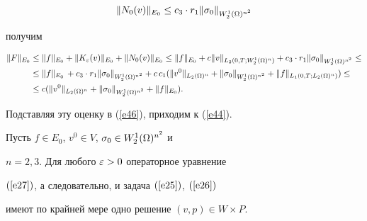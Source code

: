 \begin{pf}
\begin{equation}\label{e47}


\|N_0(v)\|_{E_0} \le c_3 \cdot r_1\|\sig_0\|_{W^1_2(\Om)^{n^2}}


\end{equation}


получим


\begin{align*}


\|F\|_{E_0}&\le \|f\|_{E_0}+\|K_{\eps}(v)\|_{E_0}+\|


N_0(v)\|_{E_0}\le\|f\|_{E_0}+c\|v\|_{L_2(0,T;W_2^1(\Om)^n)}+


c_3 \cdot r_1 \|\sig_0\|_{W^1_2(\Om)^{n^2}}\le\\


%


&\le \|f\|_{E_0}\,+c_3\cdot r_1


\|\sig_0\|_{W^1_2(\Om)^{n^2}}+c\,c_1 (\|v^0\|_{L_2(\Om)^n}+


\|\sig_0\|_{W^1_2(\Om)^{n^2}}+\|f\|_{L_1(0,T;L_2(\Om)^n)})\le\\


%


&\le c(\|v^0\|_{L_2(\Om)^n}+\|\sig_0\|_{W^1_2(\Om)^{n^2}}


+\|f\|_{E_0}).


\end{align*}


Подставляя эту оценку в (\ref{e46}), приходим к (\ref{e44}).


\end{pf}








\begin{thms}\label{t42}


Пусть $f\in E_0$, $v^0\in V$, $\sigma_0\in W_2^{1}(\Omega)^{n^2}$ и


$n=2,3$. Для любого $\varepsilon>0$ операторное уравнение


$(\ref{e27})$, а следовательно, и задача $(\ref{e25})$, $(\ref{e26})$


имеют по крайней мере одно решение $(v,p) \in W \times P$.


\end{thms}






